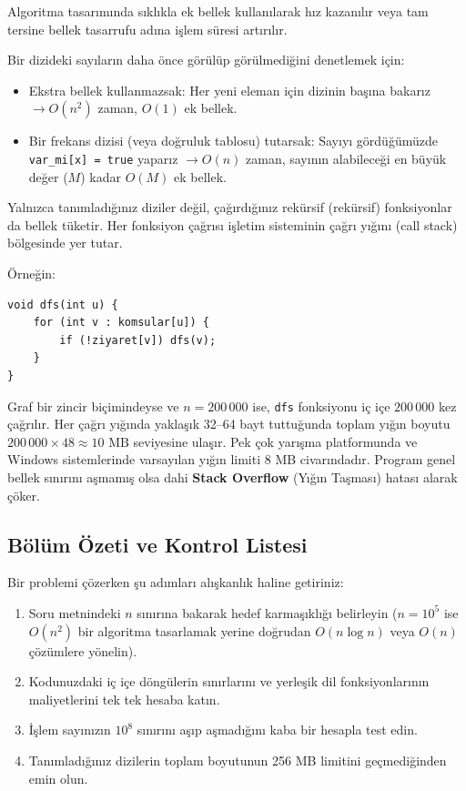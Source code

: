 \begin{example}
Algoritma tasarımında sıklıkla ek bellek kullanılarak hız kazanılır veya tam tersine bellek tasarrufu adına işlem süresi artırılır.

Bir dizideki sayıların daha önce görülüp görülmediğini denetlemek için:
\begin{itemize}
    \item Ekstra bellek kullanmazsak: Her yeni eleman için dizinin başına bakarız $\to O(n^2)$ zaman, $O(1)$ ek bellek.
    \item Bir frekans dizisi (veya doğruluk tablosu) tutarsak: Sayıyı gördüğümüzde \texttt{var\_mi[x] = true} yaparız $\to O(n)$ zaman, sayının alabileceği en büyük değer ($M$) kadar $O(M)$ ek bellek.
\end{itemize}
\end{example}

\begin{example}
Yalnızca tanımladığınız diziler değil, çağırdığınız rekürsif (rekürsif) fonksiyonlar da bellek tüketir. Her fonksiyon çağrısı işletim sisteminin çağrı yığını (call stack) bölgesinde yer tutar.

Örneğin:
\begin{lstlisting}[language=CTemel]
void dfs(int u) {
    for (int v : komsular[u]) {
        if (!ziyaret[v]) dfs(v);
    }
}
\end{lstlisting}
Graf bir zincir biçimindeyse ve $n = 200\,000$ ise, \texttt{dfs} fonksiyonu iç içe $200\,000$ kez çağrılır. Her çağrı yığında yaklaşık 32--64 bayt tuttuğunda toplam yığın boyutu $200\,000 \times 48 \approx 10 \text{ MB}$ seviyesine ulaşır. Pek çok yarışma platformunda ve Windows sistemlerinde varsayılan yığın limiti 8 MB civarındadır. Program genel bellek sınırını aşmamış olsa dahi \textbf{Stack Overflow} (Yığın Taşması) hatası alarak çöker.
\end{example}

\subsection{Bölüm Özeti ve Kontrol Listesi}

Bir problemi çözerken şu adımları alışkanlık haline getiriniz:
\begin{enumerate}
    \item Soru metnindeki $n$ sınırına bakarak hedef karmaşıklığı belirleyin ($n = 10^5$ ise $O(n^2)$ bir algoritma tasarlamak yerine doğrudan $O(n \log n)$ veya $O(n)$ çözümlere yönelin).
    \item Kodunuzdaki iç içe döngülerin sınırlarını ve yerleşik dil fonksiyonlarının maliyetlerini tek tek hesaba katın.
    \item İşlem sayınızın $10^8$ sınırını aşıp aşmadığını kaba bir hesapla test edin.
    \item Tanımladığınız dizilerin toplam boyutunun 256 MB limitini geçmediğinden emin olun.
\end{enumerate}
